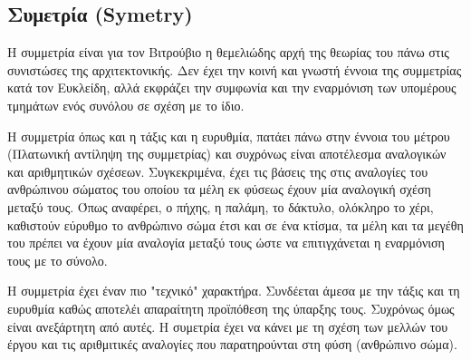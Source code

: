 \subsection{Συμετρία (Symetry)}

Η συμμετρία είναι για τον Βιτρούβιο η θεμελιώδης αρχή της θεωρίας του πάνω στις συνιστώσες της αρχιτεκτονικής. Δεν έχει την κοινή και γνωστή έννοια της συμμετρίας κατά τον Ευκλείδη, αλλά εκφράζει την συμφωνία και την εναρμόνιση των υπομέρους τμημάτων ενός συνόλου σε σχέση με το ίδιο.

Η συμμετρία όπως και η τάξις και η ευρυθμία, πατάει πάνω στην έννοια του μέτρου (Πλατωνική αντίληψη της συμμετρίας) και συχρόνως είναι αποτέλεσμα αναλογικών και αριθμητικών σχέσεων. Συγκεκριμένα, έχει τις βάσεις της στις αναλογίες του ανθρώπινου σώματος του οποίου τα μέλη εκ φύσεως έχουν μία αναλογική σχέση μεταξύ τους. Όπως αναφέρει, ο πήχης, η παλάμη, το δάκτυλο, ολόκληρο το χέρι, καθιστούν εύρυθμο το ανθρώπινο σώμα έτσι και σε ένα κτίσμα, τα μέλη και τα μεγέθη του πρέπει να έχουν μία αναλογία μεταξύ τους ώστε να επιτιγχάνεται η εναρμόνιση τους με το σύνολο. \cite[σ.~51,187]{vitruvius-lefas,lefas-fundamental}

Η συμμετρία έχει έναν πιο "τεχνικό" χαρακτήρα. Συνδέεται άμεσα με την τάξις και τη ευρυθμία καθώς αποτελέι απαραίτητη προϊπόθεση της ύπαρξης τους. Συχρόνως όμως είναι ανεξάρτητη από αυτές. Η συμετρία έχει να κάνει με τη σχέση των μελλών του έργου και τις αριθμιτικές αναλογίες που παρατηρούνται στη φύση (ανθρώπινο σώμα). \cite[σ.~96]{vitruvius-lefas}





